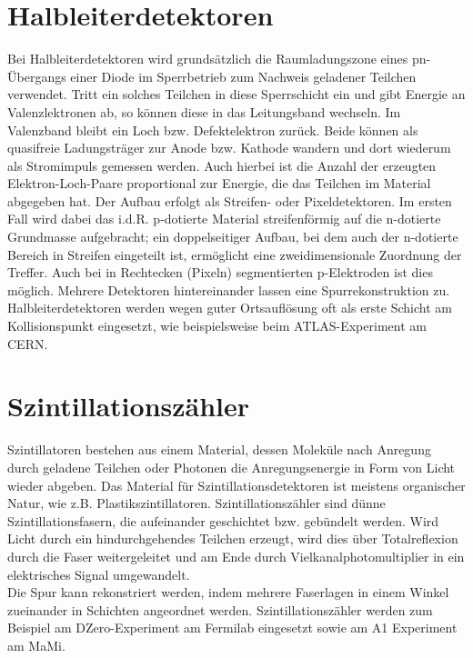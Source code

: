 \documentclass{PoS}
\begin{document}
\section{Halbleiterdetektoren}

Bei Halbleiterdetektoren wird grundsätzlich die Raumladungszone eines pn-Übergangs einer Diode im
Sperrbetrieb zum Nachweis geladener Teilchen verwendet. Tritt ein solches Teilchen in diese
Sperrschicht ein und gibt Energie an Valenzlektronen ab, so können diese in das Leitungsband
wechseln. Im Valenzband bleibt ein Loch bzw. Defektelektron zurück. Beide können als quasifreie
Ladungsträger zur Anode bzw. Kathode wandern und dort wiederum als Stromimpuls gemessen werden.
Auch hierbei ist die Anzahl der erzeugten Elektron-Loch-Paare proportional zur Energie, die das
Teilchen im Material abgegeben hat.
Der Aufbau erfolgt als Streifen- oder Pixeldetektoren. Im ersten Fall wird dabei das i.d.R. 
p-dotierte Material streifenförmig auf die n-dotierte Grundmasse aufgebracht; ein doppelseitiger
Aufbau, bei dem auch der n-dotierte Bereich in Streifen eingeteilt ist, ermöglicht eine
zweidimensionale Zuordnung der Treffer. Auch bei in Rechtecken (Pixeln) segmentierten p-Elektroden
ist dies möglich. Mehrere Detektoren hintereinander lassen eine Spurrekonstruktion zu.\\
Halbleiterdetektoren werden wegen guter Ortsauflösung oft als erste Schicht am Kollisionspunkt
eingesetzt, wie beispielsweise beim ATLAS-Experiment am CERN.

\section{Szintillationszähler}

Szintillatoren bestehen aus einem Material, dessen Moleküle nach Anregung durch geladene Teilchen
oder Photonen die Anregungsenergie in Form von Licht wieder abgeben. Das Material für
Szintillationsdetektoren ist meistens organischer Natur, wie z.B. Plastikszintillatoren.
Szintillationszähler sind dünne Szintillationsfasern, die aufeinander geschichtet bzw. gebündelt
werden. Wird Licht durch ein hindurchgehendes Teilchen erzeugt, wird dies über Totalreflexion durch 
die Faser weitergeleitet und am Ende durch Vielkanalphotomultiplier in ein elektrisches Signal
umgewandelt.
\\
Die Spur kann rekonstriert werden, indem mehrere Faserlagen in einem Winkel zueinander in Schichten
angeordnet werden. Szintillationszähler werden zum Beispiel am DZero-Experiment am Fermilab
eingesetzt sowie am A1 Experiment am MaMi.
\end{document}
